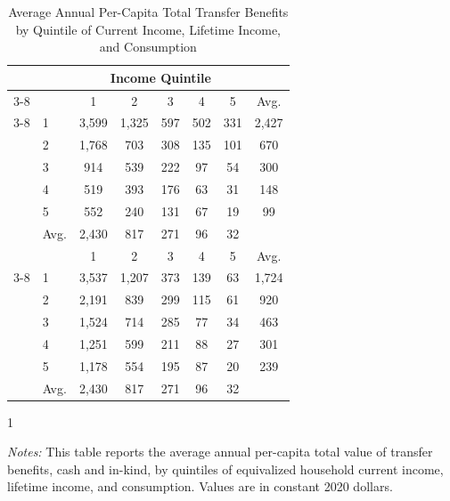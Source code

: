 \begin{table}[t]
\small
 \caption{Average Annual Per-Capita Total Transfer Benefits \\ by Quintile of Current Income, Lifetime Income, and Consumption}
 \label{tab:quintile_avgben}
\begin{tabular*}{\textwidth}{@{\extracolsep{\fill}}llcccccc@{}}
\toprule
                                      &   & \multicolumn{5}{c}{Income Quintile}                                                                    \\ \cmidrule{3-8}
                                      &   & 1                  & 2                  & 3                  & 4                  & 5        & Avg.            \\ \cmidrule{3-8}
\multirow{5}{*}{Consumption Quintile} & 1 & 3,599 & 1,325 & 597 & 502 & 331 & 2,427 \\
                                      & 2 & 1,768 & 703 & 308 & 135 & 101 & 670 \\
                                      & 3 & 914 & 539 & 222 & 97 & 54 & 300 \\
                                      & 4 & 519 & 393 & 176 & 63 & 31 & 148 \\
                                      & 5 & 552 & 240 & 131 & 67 & 19 & 99 \\
                                      & Avg. & 2,430 & 817 & 271 & 96 & 32 \\ \midrule
                                        &   & 1                  & 2                  & 3                  & 4                  & 5       & Avg.           \\ \cmidrule{3-8}
\multirow{5}{*}{Lifetime Income Quintile} & 1 & 3,537 & 1,207 & 373 & 139 & 63 & 1,724 \\
                                      & 2 & 2,191 & 839 & 299 & 115 & 61 & 920 \\
                                      & 3 & 1,524 & 714 & 285 & 77 & 34 & 463\\
                                      & 4 & 1,251 & 599 & 211 & 88 & 27 & 301\\
                                      & 5 & 1,178 & 554 & 195 & 87 & 20  & 239\\ 
                                      & Avg. & 2,430 & 817 & 271 & 96 & 32 \\\bottomrule
\end{tabular*}
            \begin{spacing}{1}
\begin{tablenotes}
       \item \footnotesize \textit{Notes:} This table reports the average annual per-capita total value of transfer benefits, cash and in-kind, by quintiles of equivalized household current income, lifetime income, and consumption. Values are in constant 2020 dollars.
      \end{tablenotes}
       \end{spacing}
\end{table}
    
